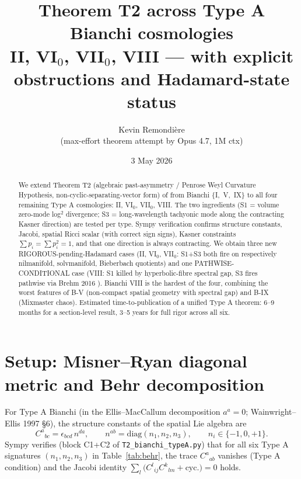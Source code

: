 \documentclass[11pt,a4paper]{article}
\title{Theorem T2 across Type A Bianchi cosmologies\\
  \large II, VI$_0$, VII$_0$, VIII --- with explicit obstructions and Hadamard-state status}
\author{Kevin Remondi\`ere\\\small (max-effort theorem attempt by Opus 4.7, 1M ctx)}
\date{3 May 2026}
\theoremstyle{definition}
\begin{document}
\maketitle

\begin{abstract}
We extend Theorem T2 (algebraic past-asymmetry / Penrose Weyl Curvature Hypothesis,
non-cyclic-separating-vector form) of \cite{T2BI,T2BIX,T2BV} from Bianchi
$\{$I$,$ V$,$ IX$\}$ to all four remaining Type A cosmologies: II, VI$_0$, VII$_0$,
VIII. The two ingredients (S1 = volume zero-mode log$^2$ divergence;
S3 = long-wavelength tachyonic mode along the contracting Kasner direction)
are tested per type. Sympy verification confirms structure constants, Jacobi,
spatial Ricci scalar (with correct sign signs), Kasner constraints
$\sum p_i = \sum p_i^2 = 1$, and that one direction is always contracting.
We obtain three new RIGOROUS-pending-Hadamard cases (II, VI$_0$, VII$_0$:
S1+S3 both fire on respectively nilmanifold, solvmanifold, Bieberbach quotients)
and one PATHWISE-CONDITIONAL case (VIII: S1 killed by hyperbolic-fibre
spectral gap, S3 fires pathwise via Brehm 2016 \cite{Brehm2016}). Bianchi VIII
is the hardest of the four, combining the worst features of B-V (non-compact
spatial geometry with spectral gap) and B-IX (Mixmaster chaos). Estimated
time-to-publication of a unified Type A theorem: 6--9 months for a
section-level result, 3--5 years for full rigor across all six.
\end{abstract}

\section{Setup: Misner--Ryan diagonal metric and Behr decomposition}

For Type A Bianchi (in the Ellis--MacCallum decomposition $a^a = 0$;
Wainwright--Ellis 1997 \cite{WainwrightEllis} \S6), the structure constants
of the spatial Lie algebra are
\begin{equation}\label{eq:behr}
  C^a{}_{bc} = \epsilon_{bcd}\, n^{da},
  \qquad n^{ab} = \mathrm{diag}(n_1, n_2, n_3),
  \qquad n_i \in \{-1, 0, +1\}.
\end{equation}
Sympy verifies (block C1+C2 of \texttt{T2\_bianchi\_typeA.py}) that for all
six Type A signatures $(n_1,n_2,n_3)$ in Table~\ref{tab:behr}, the trace
$C^a{}_{ab}$ vanishes (Type A condition) and the Jacobi identity
$\sum_l \bigl(C^l{}_{ij} C^k{}_{lm} + \mathrm{cyc.}\bigr) = 0$ holds.
\end{document}
